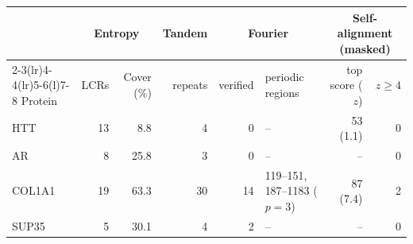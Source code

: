 \begin{tabular}{@{}lrrrrlrr@{}}
\toprule
 & \multicolumn{2}{c}{Entropy} & Tandem & \multicolumn{2}{c}{Fourier} & \multicolumn{2}{c}{Self-alignment (masked)} \\
\cmidrule(lr){2-3}\cmidrule(lr){4-4}\cmidrule(lr){5-6}\cmidrule(l){7-8}
Protein & LCRs & Cover (\%) & repeats & verified & periodic regions & top score ($z$) & $z \ge 4$ \\
\midrule
HTT & 13 & 8.8 & 4 & 0 & -- & 53 (1.1) & 0 \\
AR & 8 & 25.8 & 3 & 0 & -- & -- & 0 \\
COL1A1 & 19 & 63.3 & 30 & 14 & 119--151, 187--1183 ($p{=}3$) & 87 (7.4) & 2 \\
SUP35 & 5 & 30.1 & 4 & 2 & -- & -- & 0 \\
\bottomrule
\end{tabular}
